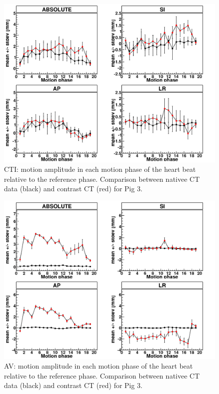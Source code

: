 \documentclass[type=dr, dr=rernat, accentcolor=tud7b,colorbacktitle, bigchapter, openright, twoside, 12pt ]{tudthesis}
\begin{document}
\newpage


\begin{figure}[H]
\begin{center}
 \includegraphics[scale=0.22]{Mayo_CTI_HB_NATIV_VS_CONTRAST.png}
\caption{CTI: motion amplitude in each motion phase of the heart beat relative to the reference phase. Comparison between nativee CT data 
(black) and contrast CT (red) for Pig 3.}
\label{motion_hb_cti_contrast_native}
\end{center}
\end{figure}


\vspace*{-0.5cm}

\begin{figure}[H]
\begin{center}
 \includegraphics[scale=0.22]{Mayo_AV_NATIV_VS_HB_CONTRAST.png}
\caption{AV: motion amplitude in each motion phase of the heart beat relative to the reference phase. Comparison between nativee CT data 
(black) and contrast CT (red) for Pig 3.}
\label{motion_hb_av_contrast_native}
\end{center}
\end{figure}
\end{document}

